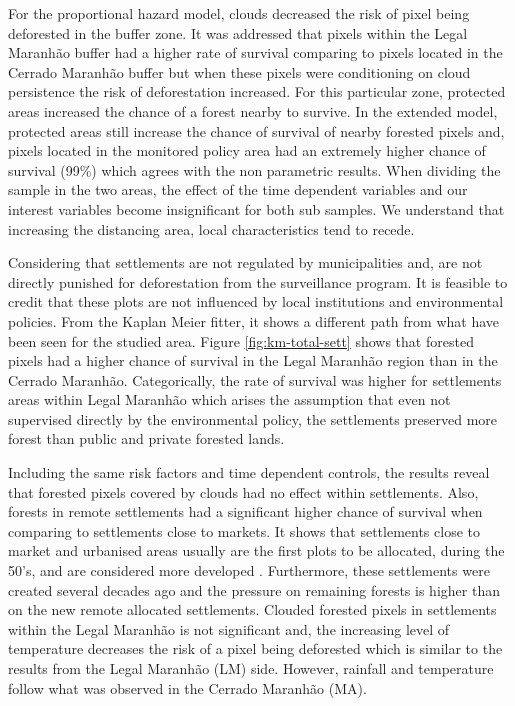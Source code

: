 For the proportional hazard model, clouds decreased the risk of pixel being deforested in the buffer zone. It was addressed that pixels within the Legal Maranhão buffer had a higher rate of survival comparing to pixels located in the Cerrado Maranhão buffer but when these pixels were conditioning on cloud persistence the risk of deforestation increased. For this particular zone, protected areas increased the chance of a forest nearby to survive. In the extended model, protected areas still increase the chance of survival of nearby forested pixels and, pixels located in the monitored policy area had an extremely higher chance of survival (99\%) which agrees with the non parametric results. When dividing the sample in the two areas, the effect of the time dependent variables and our interest variables become insignificant for both sub samples. We understand that increasing the distancing area, local characteristics tend to recede. 

Considering that settlements are not regulated by municipalities and, are not directly punished for deforestation from the surveillance program. It is feasible to credit that these plots are not influenced by local institutions and environmental policies. From the Kaplan Meier fitter, it shows a different path from what have been seen for the studied area. Figure \ref{fig:km-total-sett} shows that forested pixels had a higher chance of survival in the Legal Maranhão region than in the Cerrado Maranhão. Categorically, the rate of survival was higher for settlements areas within Legal Maranhão which arises the assumption that even not supervised directly by the environmental policy, the settlements preserved more forest than public and private forested lands. 


Including the same risk factors and time dependent controls, the results reveal that forested pixels covered by clouds had no effect within settlements. Also, forests in remote settlements had a significant higher chance of survival when comparing to settlements close to markets. It shows that settlements close to market and urbanised areas usually are the first plots to be allocated, during the 50's, and are considered more developed \citep[p.~12]{alencar_2016}. Furthermore, these settlements were created several decades ago and the pressure on remaining forests is higher than on the new remote allocated settlements. Clouded forested pixels in settlements within the Legal Maranhão is not significant and, the increasing level of temperature decreases the risk of a pixel being deforested which is similar to the results from the Legal Maranhão (LM) side. However, rainfall and temperature follow what was observed in the Cerrado Maranhão (MA).

